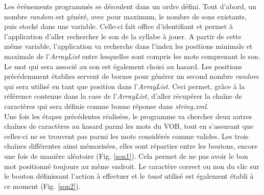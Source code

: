 Les événements programmés se déroulent dans un ordre défini. Tout d'abord, un nombre \textit{random} est généré, avec pour maximum, le nombre de sons existants, puis stocké dans une variable. Celle-ci fait office d'identifiant et permet à l'application d'aller rechercher le son de la syllabe à jouer. A partir de cette même variable, l'application va recherche dans l'index les positions minimale et maximale de l'\textit{ArrayList} entre lesquelles sont compris les mots comprenant le son. Le mot qui sera associé au son est également choisi au hasard. Les positions précédemment établies servent de bornes pour générer un second nombre \textit{random} qui sera utilisé en tant que position dans l'\textit{ArrayList}. Ceci permet, grâce à la référence contenue dans la case de l'\textit{ArrayList}, d'aller récupérer la chaîne de caractères qui sera définie comme bonne réponse dans \textit{string.xml}.\\

Une fois les étapes précédentes réalisées, le programme va chercher deux autres chaînes de caractères au hasard parmi les mots du VOB, tout en s'assurant que celles-ci ne se trouvent pas parmi les mots considérés comme valides. Les trois chaînes différentes ainsi mémorisées, elles sont réparties entre les boutons, encore une fois de manière aléatoire (Fig. \ref{son1}). Cela permet de ne pas avoir le bon mot positionné toujours au même endroit. Le caractère correct ou non du clic sur le bouton définissant l'action à effectuer et le \textit{toast} utilisé est également établi à ce moment (Fig. \ref{son2}).\\

